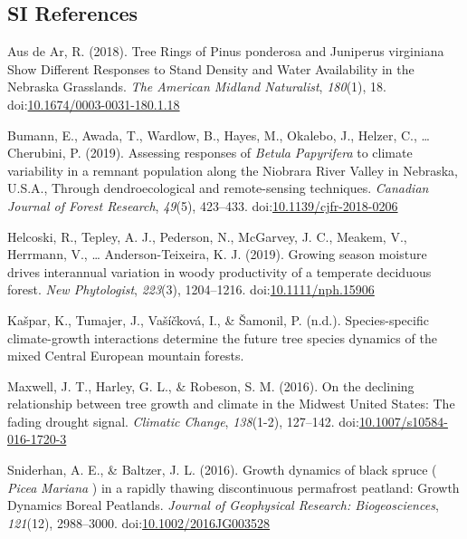 \documentclass[
]{article}
\newlength{\cslhangindent}
\newenvironment{cslreferences}%
  {\setlength{\parindent}{0pt}%
  \everypar{\setlength{\hangindent}{\cslhangindent}}\ignorespaces}%
  {\par}
\begin{document}
\newpage

\hypertarget{si-references}{%
\subsection*{SI References}\label{si-references}}

\hypertarget{refs}{}
\begin{cslreferences}
\leavevmode\hypertarget{ref-aus_de_ar_tree_2018}{}%
Aus de Ar, R. (2018). Tree Rings of Pinus ponderosa and Juniperus
virginiana Show Different Responses to Stand Density and Water
Availability in the Nebraska Grasslands. \emph{The American Midland
Naturalist}, \emph{180}(1), 18.
doi:\href{https://doi.org/10.1674/0003-0031-180.1.18}{10.1674/0003-0031-180.1.18}

\leavevmode\hypertarget{ref-bumann_assessing_2019}{}%
Bumann, E., Awada, T., Wardlow, B., Hayes, M., Okalebo, J., Helzer, C.,
\ldots{} Cherubini, P. (2019). Assessing responses of \emph{Betula}
\emph{Papyrifera} to climate variability in a remnant population along
the Niobrara River Valley in Nebraska, U.S.A., Through dendroecological
and remote-sensing techniques. \emph{Canadian Journal of Forest
Research}, \emph{49}(5), 423--433.
doi:\href{https://doi.org/10.1139/cjfr-2018-0206}{10.1139/cjfr-2018-0206}

\leavevmode\hypertarget{ref-helcoski_growing_2019}{}%
Helcoski, R., Tepley, A. J., Pederson, N., McGarvey, J. C., Meakem, V.,
Herrmann, V., \ldots{} Anderson-Teixeira, K. J. (2019). Growing season
moisture drives interannual variation in woody productivity of a
temperate deciduous forest. \emph{New Phytologist}, \emph{223}(3),
1204--1216.
doi:\href{https://doi.org/10.1111/nph.15906}{10.1111/nph.15906}

\leavevmode\hypertarget{ref-kaspar_species-specific_nodate}{}%
Kašpar, K., Tumajer, J., Vašíčková, I., \& Šamonil, P. (n.d.).
Species-specific climate-growth interactions determine the future tree
species dynamics of the mixed Central European mountain forests.

\leavevmode\hypertarget{ref-maxwell_declining_2016}{}%
Maxwell, J. T., Harley, G. L., \& Robeson, S. M. (2016). On the
declining relationship between tree growth and climate in the Midwest
United States: The fading drought signal. \emph{Climatic Change},
\emph{138}(1-2), 127--142.
doi:\href{https://doi.org/10.1007/s10584-016-1720-3}{10.1007/s10584-016-1720-3}

\leavevmode\hypertarget{ref-sniderhan_growth_2016}{}%
Sniderhan, A. E., \& Baltzer, J. L. (2016). Growth dynamics of black
spruce ( \emph{Picea} \emph{Mariana} ) in a rapidly thawing
discontinuous permafrost peatland: Growth Dynamics Boreal Peatlands.
\emph{Journal of Geophysical Research: Biogeosciences}, \emph{121}(12),
2988--3000.
doi:\href{https://doi.org/10.1002/2016JG003528}{10.1002/2016JG003528}


\end{cslreferences}
\end{document}
